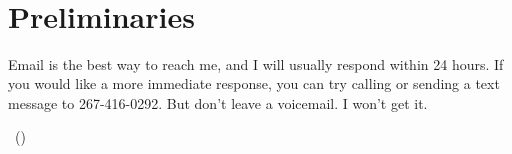 \begin{flushleft}
\quad\\
\bigskip
\bigskip
\textsf{\mytitle}\\

\vspace{3mm}
\textsf{\myauthor\\
\myemail\\}

\end{flushleft}
\vspace{3mm}

\section{Preliminaries}

\noindent Email is the best way to reach me, and I will usually respond within 24 hours. If you would like a more immediate response, you can try calling or sending a text message to 267-416-0292. But don't leave a voicemail. I won't get it.
 
\vspace{2mm}
\noindent \meeting ~(\myaddress)

